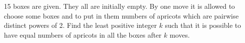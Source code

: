 15 boxes are given. They all  are initially empty. By one move it is allowed to choose some boxes and to put in them numbers of apricots which are pairwise distinct powers of 2. Find the least positive integer $k$ such that it is possible to have equal numbers of apricots in all the boxes after $k$ moves.